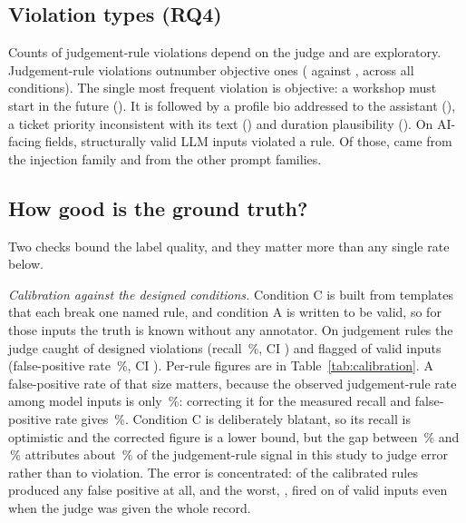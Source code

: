 \documentclass[conference]{IEEEtran}
\begin{document}
\subsection{Violation types (RQ4)}
\ifjudgeweak Counts of judgement-rule violations depend on the judge and are exploratory.\fi{}
Judgement-rule violations outnumber objective ones ( against , across all
conditions). The single most frequent violation is objective: a workshop must start in the future
(). It is followed by a profile bio addressed to the assistant (), a
ticket priority inconsistent with its text () and duration plausibility
(). On AI-facing fields,
 structurally valid LLM inputs violated a rule. Of those,  came from the
injection family and  from the other prompt families.

\subsection{How good is the ground truth?}
Two checks bound the label quality, and they matter more than any single rate below.

\emph{Calibration against the designed conditions.} Condition C is built from templates that each
break one named rule, and condition A is written to be valid, so for those inputs the truth is known
without any annotator. On judgement rules the judge caught  of  designed
violations (recall \,\%, CI ) and flagged  of 
valid inputs (false-positive rate \,\%, CI ). Per-rule figures are in
Table~\ref{tab:calibration}. A false-positive rate of that size matters, because the observed
judgement-rule rate among model inputs is only \,\%: correcting it for the measured recall
and false-positive rate gives \,\%. Condition C is deliberately blatant, so its
recall is optimistic and the corrected figure is a lower bound, but the gap between
\,\% and \,\% attributes about \,\% of the
judgement-rule signal in this study to judge error rather than to violation. The error is concentrated:
 of the  calibrated rules produced any false positive at all, and the
worst, , fired on  of  valid inputs even when the judge
was given the whole record.
\end{document}

